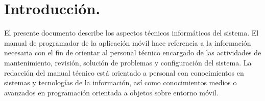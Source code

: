 \section{Introducción.}
El presente documento describe los aspectos técnicos informáticos del sistema. El manual de programador de la aplicación móvil hace referencia a la información necesaria con el fin de orientar al personal técnico encargado de las actividades de mantenimiento, revisión, solución de problemas y configuración del sistema.
La redacción del manual técnico está orientado a personal con conocimientos en sistemas y tecnologías de la información, así como conocimientos medios o avanzados en programación orientada a objetos sobre entorno móvil.